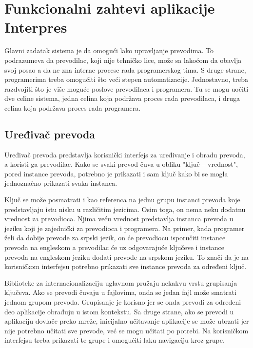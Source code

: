 \chapter{Funkcionalni zahtevi aplikacije Interpres}\label{ch:funkcionalni_zahtevi}

Glavni zadatak sistema je da omogući lako upravljanje prevodima. To podrazumeva da prevodilac, koji nije tehničko 
lice, može sa lakoćom da obavlja svoj posao a da ne zna interne procese rada programerskog tima. S druge
strane, programerima treba omogućiti što veći stepen automatizacije. Jednostavno, treba razdvojiti što je
više moguće poslove prevodilaca i programera. Tu se mogu uočiti dve celine sistema, jedna celina koja podržava
proces rada prevodilaca, i druga celina koja podržava proces rada programera.


\section{Uređivač prevoda}\label{sec:funkcionalni_zahtevi-uredjivac_prevoda}

Uređivač prevoda predstavlja korisnički interfejs za uređivanje i obradu prevoda, a koristi ga prevodilac.
Kako se svaki prevod čuva u obliku "ključ -- vrednost", pored instance prevoda, potrebno je prikazati i sam 
ključ kako bi se mogla jednoznačno prikazati svaka instanca.

Ključ se može posmatrati i kao referenca na jednu grupu instanci prevoda koje predstavljaju istu nisku u različitim 
jezicima. Osim toga, on nema neku dodatnu vrednost za prevodioca.
Njima veću vrednost predstavlja instanca prevoda u jeziku koji je zajednički za prevodioca i programera. Na primer, kada 
programer želi da dobije prevode za srpski jezik, on će prevodiocu isporučiti instance prevoda na engleskom a prevodilac 
će uz odgovarajuće ključeve i instance prevoda na engleskom jeziku dodati prevode na srpskom jeziku. To znači da je na 
korisničkom interfejsu potrebno prikazati sve instance prevoda za određeni ključ.

Biblioteke za internacionalizaciju uglavnom pružaju nekakvu vrstu grupisanja ključeva. Ako se prevodi čuvaju u 
fajlovima, onda se jedan fajl može smatrati jednom grupom prevoda. Grupisanje je korisno jer se onda prevodi 
za određeni deo aplikacije obrađuju u istom kontekstu. Sa druge strane, ako se prevodi u aplikaciju dovlače 
preko mreže, inicijalno učitavanje aplikacije se može ubrzati jer nije potrebno učitati sve prevode, već se 
mogu učitati po potrebi. Na korisničkom interfejsu treba prikazati te grupe i omogućiti laku navigaciju kroz
grupe.

